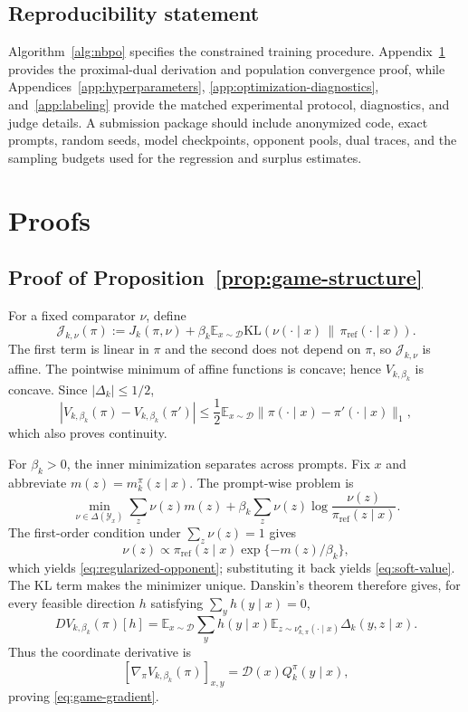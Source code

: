 \documentclass{article}
\theoremstyle{remark}
\theoremstyle{plain}
\newcommand{\Y}{\mathcal{Y}}
\newcommand{\KL}{\mathrm{KL}}
\newcommand{\E}{\mathbb{E}}
\newcommand{\D}{\mathcal{D}}
\newcommand{\piref}{\pi_{\mathrm{ref}}}
\begin{document}
\subsection*{Reproducibility statement}
Algorithm~\ref{alg:nbpo} specifies the constrained training procedure. Appendix~\ref{app:proofs} provides the proximal-dual derivation and population convergence proof, while Appendices~\ref{app:hyperparameters}, \ref{app:optimization-diagnostics}, and~\ref{app:labeling} provide the matched experimental protocol, diagnostics, and judge details. A submission package should include anonymized code, exact prompts, random seeds, model checkpoints, opponent pools, dual traces, and the sampling budgets used for the regression and surplus estimates.




\appendix

\section{Proofs}
\label{app:proofs}

\subsection{Proof of Proposition~\ref{prop:game-structure}}
\label{app:proof-game-structure}
For a fixed comparator $\nu$, define
\[
\mathcal J_{k,\nu}(\pi)
:=
J_k(\pi,\nu)
+
\beta_k\E_{x\sim\D}
\KL\!\left(\nu(\cdot\mid x)\,\|\,\piref(\cdot\mid x)\right).
\]
The first term is linear in $\pi$ and the second does not depend on $\pi$, so $\mathcal J_{k,\nu}$ is affine. The pointwise minimum of affine functions is concave; hence $V_{k,\beta_k}$ is concave. Since $|\Delta_k|\le1/2$,
\[
|V_{k,\beta_k}(\pi)-V_{k,\beta_k}(\pi')|
\le
\frac12\E_{x\sim\D}
\|\pi(\cdot\mid x)-\pi'(\cdot\mid x)\|_1,
\]
which also proves continuity.

For $\beta_k>0$, the inner minimization separates across prompts. Fix $x$ and abbreviate $m(z)=m_k^\pi(z\mid x)$. The prompt-wise problem is
\[
\min_{\nu\in\Delta(\Y_x)}
\sum_z\nu(z)m(z)
+
\beta_k\sum_z\nu(z)
\log\frac{\nu(z)}{\piref(z\mid x)}.
\]
The first-order condition under $\sum_z\nu(z)=1$ gives
\[
\nu(z)\propto\piref(z\mid x)\exp\{-m(z)/\beta_k\},
\]
which yields \eqref{eq:regularized-opponent}; substituting it back yields \eqref{eq:soft-value}. The KL term makes the minimizer unique. Danskin's theorem therefore gives, for every feasible direction $h$ satisfying $\sum_yh(y\mid x)=0$,
\[
D V_{k,\beta_k}(\pi)[h]
=
\E_{x\sim\D}\sum_y h(y\mid x)
\E_{z\sim\nu^\star_{k,\pi}(\cdot\mid x)}
\Delta_k(y,z\mid x).
\]
Thus the coordinate derivative is
\[
\left[\nabla_\pi V_{k,\beta_k}(\pi)\right]_{x,y}
=
\D(x)Q_k^\pi(y\mid x),
\]
proving \eqref{eq:game-gradient}.
\end{document}
